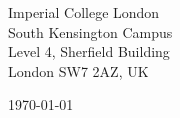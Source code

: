 \begin{minipage}{0.49\textwidth}
\begin{flushleft}
\noindent
Imperial College London \\
South Kensington Campus \\
Level 4, Sherfield Building \\
London SW7 2AZ, UK \\

\end{flushleft}
\end{minipage}
\begin{minipage}{0.47\textwidth}
\begin{flushright}
\today
\end{flushright}
\end{minipage} \\

\newcommand{\univ}{Imperial College London}
\newcommand{\univshort}{ICL}
\newcommand{\degree}{MSc degree in Advanced Computing}
\newcommand{\dept}{Computing}



